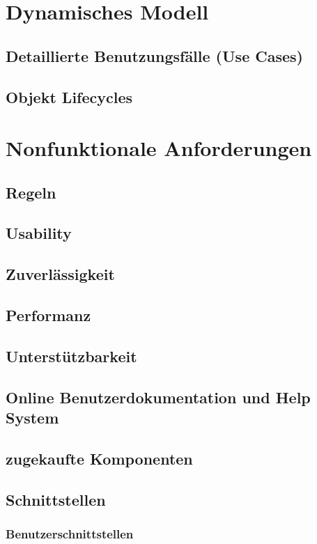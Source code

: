 \documentclass[a4paper,12pt,twoside]{scrreprt}
\begin{document}
    \chapter{Dynamisches Modell}
    \section{Detaillierte Benutzungsfälle (Use Cases)}
        

    \section{Objekt Lifecycles}

    \chapter{Nonfunktionale Anforderungen  }
    \section{Regeln}
    \section{Usability}
    \section{Zuverlässigkeit}
    \section{Performanz}
    \section{Unterstützbarkeit}
    \section{Online Benutzerdokumentation und Help System}
    \section{zugekaufte Komponenten}
    \section{Schnittstellen}
    \subsection{Benutzerschnittstellen}
\end{document}

